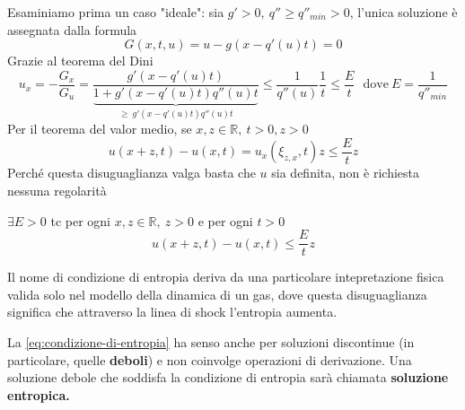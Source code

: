 \documentclass[10pt,a4paper,twoside,openright]{book}
\begin{document}
Esaminiamo prima un caso "ideale": sia $\displaystyle g' >0,\ q''\geqslant q''_{min}  >0$, l'unica soluzione è assegnata dalla formula 
\begin{equation}
	G( x,t,u) =u-g( x-q'( u) t) =0
\end{equation}
Grazie al teorema del Dini 
\begin{equation*}
	u_{x} =-\frac{G_{x}}{G_{u}} =\frac{g'( x-q'( u) t)}{\underbrace{1+g'( x-q'( u) t) q''( u) t}_{\geqslant \ g'( x-q'( u) t) q''( u) t}} \leqslant \frac{1}{q''( u)}\frac{1}{t} \leqslant \frac{E}{t} \ \ \ \text{dove} \ E=\frac{1}{q''_{min}}
\end{equation*}
Per il teorema del valor medio, se $\displaystyle x,z\in \mathbb{R} ,\ t >0,z >0\ $
\begin{equation*}
	u( x+z,t) -u( x,t) =u_{x}( \xi _{z,x} ,t) z\leqslant \frac{E}{t} z
\end{equation*}
Perché questa disuguaglianza valga basta che $\displaystyle u$ sia definita, non è richiesta nessuna regolarità
\begin{definition}
	 $\displaystyle \exists E >0$ tc per ogni $\displaystyle x,z\in \mathbb{R} ,\ z >0$ e per ogni $\displaystyle t >0$
	\begin{equation}
		u( x+z,t) -u( x,t) \leqslant \frac{E}{t} z
		\label{eq:condizione-di-entropia}
	\end{equation}
\end{definition}
Il nome di condizione di entropia deriva da una particolare intepretazione fisica valida solo nel modello della dinamica di un gas, dove questa disuguaglianza significa che attraverso la linea di shock l'entropia aumenta.

La \eqref{eq:condizione-di-entropia} ha senso anche per soluzioni discontinue (in particolare, quelle \textbf{deboli}) e non coinvolge operazioni di derivazione. Una soluzione debole che soddisfa la condizione di entropia sarà chiamata \textbf{soluzione entropica.}
\end{document}
